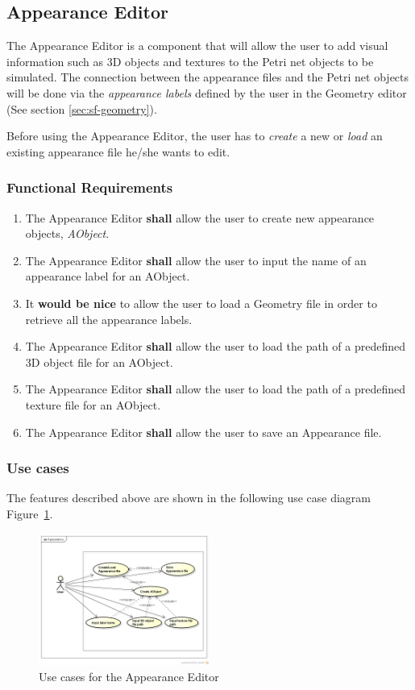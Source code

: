 \subsection{Appearance Editor}
\label{sec:sf-appearance}

The Appearance Editor is a component that will allow the user to add visual information such as 3D objects and textures to the Petri net objects to be simulated. The connection between the appearance files and the Petri net objects will be done via the \textit{appearance labels} defined by the user in the Geometry editor (See section \ref{sec:sf-geometry}). 

Before using the Appearance Editor, the user has to \textit{create} a new or \textit{load} an existing appearance file he/she wants to edit.

\subsubsection{Functional Requirements}

\begin{enumerate}
\item The Appearance Editor \textbf{shall} allow the user to create new appearance objects, \textit{AObject}.
\item The Appearance Editor \textbf{shall} allow the user to input the name of an appearance label for an AObject.
\item It \textbf{would be nice} to allow the user to load a Geometry file in order to retrieve all the appearance labels.
\item The Appearance Editor \textbf{shall} allow the user to load the path of a predefined 3D object file for an  AObject.
\item The Appearance Editor \textbf{shall} allow the user to load the path of a predefined texture file for an AObject.
\item The Appearance Editor \textbf{shall} allow the user to save an Appearance file.
     
\end{enumerate}

\subsubsection{Use cases}

The features described above are shown in the following use case diagram Figure~\ref{fig:use-cases-appearance-editor}.

\begin{figure}[htp]
\begin{center}
  \includegraphics[width=0.5\textwidth]{image/uc-appearance.png}
  \caption{Use cases for the Appearance Editor}
  \label{fig:use-cases-appearance-editor}
\end{center}
\end{figure}

